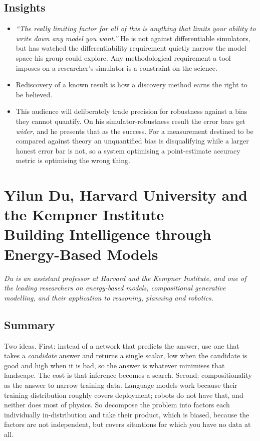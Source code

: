 \documentclass[11pt]{article}
\begin{document}
\subsection*{Insights}
\begin{itemize}
    \item \emph{``The really limiting factor for all of this is anything that limits your ability to write down any model you want.''} He is not against differentiable simulators, but has watched the differentiability requirement quietly narrow the model space his group could explore. Any methodological requirement a tool imposes on a researcher's simulator is a constraint on the science.
    \item Rediscovery of a known result is how a discovery method earns the right to be believed.
    \item This audience will deliberately trade precision for robustness against a bias they cannot quantify. On his simulator-robustness result the error bars get \emph{wider}, and he presents that as the success. For a measurement destined to be compared against theory an unquantified bias is disqualifying while a larger honest error bar is not, so a system optimising a point-estimate accuracy metric is optimising the wrong thing.
\end{itemize}

\section{Yilun Du, Harvard University and the Kempner Institute\\
{\large Building Intelligence through Energy-Based Models}}

\emph{Du is an assistant professor at Harvard and the Kempner Institute, and one of the leading researchers on energy-based models, compositional generative modelling, and their application to reasoning, planning and robotics.}

\subsection*{Summary}
Two ideas. First: instead of a network that predicts the answer, use one that takes a \emph{candidate} answer and returns a single scalar, low when the candidate is good and high when it is bad, so the answer is whatever minimises that landscape. The cost is that inference becomes a search. Second: compositionality as the answer to narrow training data. Language models work because their training distribution roughly covers deployment; robots do not have that, and neither does most of physics. So decompose the problem into factors each individually in-distribution and take their product, which is biased, because the factors are not independent, but covers situations for which you have no data at all.
\end{document}

